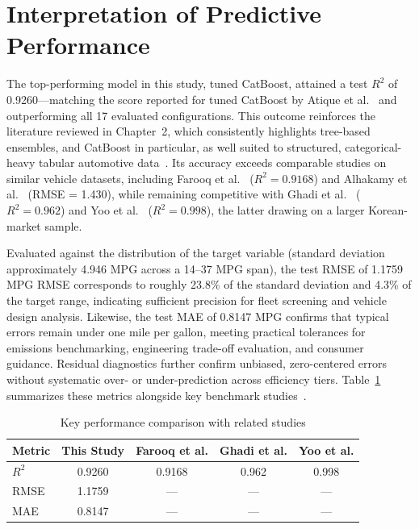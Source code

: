 \section{Interpretation of Predictive Performance}

The top-performing model in this study, tuned CatBoost, attained a test $R^2$ of 0.9260---matching the score reported for tuned CatBoost by Atique et al.~\cite{atique2026explainable} and outperforming all 17 evaluated configurations. This outcome reinforces the literature reviewed in Chapter~2, which consistently highlights tree-based ensembles, and CatBoost in particular, as well suited to structured, categorical-heavy tabular automotive data~\cite{atique2026explainable}\cite{grinsztajn2022tree}. Its accuracy exceeds comparable studies on similar vehicle datasets, including Farooq et al.~\cite{farooq2025interpretable} ($R^2 = 0.9168$) and Alhakamy et al.~\cite{alhakamy2023used} (RMSE = 1.430), while remaining competitive with Ghadi et al.~\cite{ghadi2025explainable} ($R^2 = 0.962$) and Yoo et al.~\cite{yoo2025machine} ($R^2 = 0.998$), the latter drawing on a larger Korean-market sample.

Evaluated against the distribution of the target variable (standard deviation approximately 4.946 MPG across a 14--37 MPG span), the test RMSE of 1.1759 MPG RMSE corresponds to roughly 23.8\% of the standard deviation and 4.3\% of the target range, indicating sufficient precision for fleet screening and vehicle design analysis. Likewise, the test MAE of 0.8147 MPG confirms that typical errors remain under one mile per gallon, meeting practical tolerances for emissions benchmarking, engineering trade-off evaluation, and consumer guidance. Residual diagnostics further confirm unbiased, zero-centered errors without systematic over- or under-prediction across efficiency tiers. Table~\ref{tab:comparison} summarizes these metrics alongside key benchmark studies~\cite{atique2026explainable}.

\begin{table}[H]
\centering
\setlength{\arrayrulewidth}{1.8pt}
\renewcommand{\arraystretch}{1.2}

\begin{tabular}{|l|c|c|c|c|}
\hline
\textbf{Metric} &
\textbf{This Study} &
\textbf{Farooq et al.}\cite{farooq2025interpretable} &
\textbf{Ghadi et al.}\cite{ghadi2025explainable} &
\textbf{Yoo et al.}\cite{yoo2025machine} \\
\hline
$R^2$ & 0.9260 & 0.9168 & 0.962 & 0.998 \\
\hline
RMSE & 1.1759 & --- & --- & --- \\
\hline
MAE & 0.8147 & --- & --- & --- \\
\hline
\end{tabular}

\caption{Key performance comparison with related studies}
\label{tab:comparison}
\end{table}

